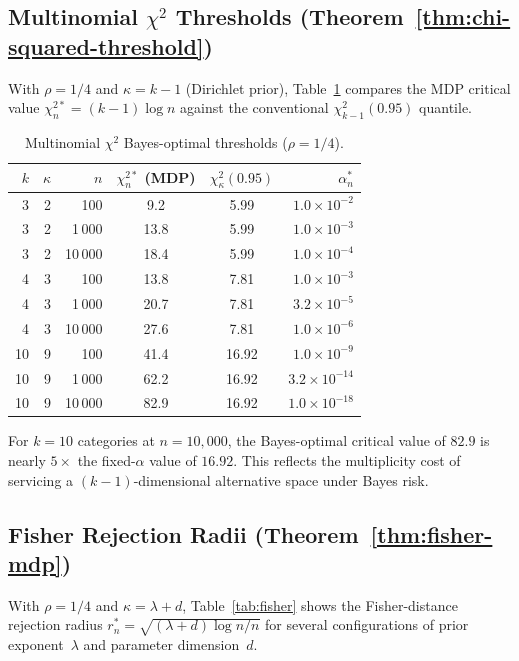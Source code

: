 \documentclass[11pt]{article}
\newcommand{\rhotail}{\rho}  %
\newcommand{\1}{\mathbf{1}}
\theoremstyle{plain}
\theoremstyle{definition}
\theoremstyle{remark}
\begin{document}
\subsection{\texorpdfstring{Multinomial $\chi^2$ Thresholds (Theorem~\ref{thm:chi-squared-threshold})}{Multinomial chi-squared Thresholds}}

With $\rhotail=1/4$ and $\kappa = k-1$ (Dirichlet prior), Table~\ref{tab:chisq} compares the MDP critical value $\chi^{2*}_n = (k-1)\log n$ against the conventional $\chi^2_{k-1}(0.95)$ quantile.

\begin{table}[!ht]
\centering
\caption{Multinomial $\chi^2$ Bayes-optimal thresholds ($\rhotail=1/4$).}\label{tab:chisq}
\smallskip
\begin{tabular}{rrrccr}
\toprule
$k$ & $\kappa$ & $n$ & $\chi^{2*}_n$ (MDP) & $\chi^2_{\kappa}(0.95)$ & $\alpha_n^{*}$ \\
\midrule
3 & 2 & 100     &  9.2 &  5.99 & $1.0\times 10^{-2}$ \\
3 & 2 & 1\,000  & 13.8 &  5.99 & $1.0\times 10^{-3}$ \\
3 & 2 & 10\,000 & 18.4 &  5.99 & $1.0\times 10^{-4}$ \\
\midrule
4 & 3 & 100     & 13.8 &  7.81 & $1.0\times 10^{-3}$ \\
4 & 3 & 1\,000  & 20.7 &  7.81 & $3.2\times 10^{-5}$ \\
4 & 3 & 10\,000 & 27.6 &  7.81 & $1.0\times 10^{-6}$ \\
\midrule
10 & 9 & 100     & 41.4 & 16.92 & $1.0\times 10^{-9}$ \\
10 & 9 & 1\,000  & 62.2 & 16.92 & $3.2\times 10^{-14}$ \\
10 & 9 & 10\,000 & 82.9 & 16.92 & $1.0\times 10^{-18}$ \\
\bottomrule
\end{tabular}
\end{table}

For $k=10$ categories at $n=10{,}000$, the Bayes-optimal critical value of $82.9$ is nearly $5\times$ the fixed-$\alpha$ value of $16.92$.
This reflects the multiplicity cost of servicing a $(k{-}1)$-dimensional alternative space under Bayes risk.


\subsection{Fisher Rejection Radii (Theorem~\ref{thm:fisher-mdp})}

With $\rhotail=1/4$ and $\kappa=\lambda+d$, Table~\ref{tab:fisher} shows the Fisher-distance rejection radius $r_n^{*}=\sqrt{(\lambda+d)\log n/n}$ for several configurations of prior exponent~$\lambda$ and parameter dimension~$d$.
\end{document}
